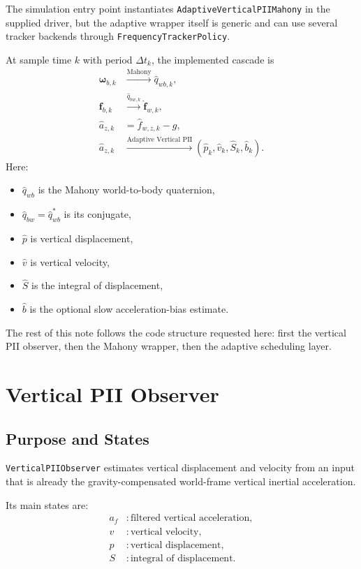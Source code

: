 \documentclass[conference]{IEEEtran}
\newcommand{\vct}[1]{\bm{#1}}
\begin{document}
The simulation entry point instantiates
\texttt{AdaptiveVerticalPIIMahony}
in the supplied driver, but the adaptive wrapper itself is generic and can
use several tracker backends through \texttt{FrequencyTrackerPolicy}.

At sample time \(k\) with period \(\Delta t_k\), the implemented cascade is
\begin{align}
\vct{\omega}_{b,k} &\xrightarrow{\text{Mahony}} \hat{q}_{wb,k}, \\
\vct{f}_{b,k} &\xrightarrow{\hat{q}_{bw,k}} \hat{\vct{f}}_{w,k}, \\
\hat{a}_{z,k} &= \hat{f}_{w,z,k} - g, \\
\hat{a}_{z,k} &\xrightarrow{\text{Adaptive Vertical PII}}
(\hat{p}_k,\hat{v}_k,\hat{S}_k,\hat{b}_k).
\end{align}
Here:
\begin{itemize}[leftmargin=1.4em]
  \item \(\hat{q}_{wb}\) is the Mahony world-to-body quaternion,
  \item \(\hat{q}_{bw}=\hat{q}_{wb}^{\ast}\) is its conjugate,
  \item \(\hat{p}\) is vertical displacement,
  \item \(\hat{v}\) is vertical velocity,
  \item \(\hat{S}\) is the integral of displacement,
  \item \(\hat{b}\) is the optional slow acceleration-bias estimate.
\end{itemize}

The rest of this note follows the code structure requested here:
first the vertical PII observer, then the Mahony wrapper,
then the adaptive scheduling layer.

\section{Vertical PII Observer}\label{sec:pii}

\subsection{Purpose and States}

\texttt{VerticalPIIObserver} estimates vertical displacement and velocity from
an input that is already the gravity-compensated world-frame vertical inertial
acceleration.

Its main states are:
\begin{align}
a_f &: \text{filtered vertical acceleration},\\
v   &: \text{vertical velocity},\\
p   &: \text{vertical displacement},\\
S   &: \text{integral of displacement}.
\end{align}
\end{document}
